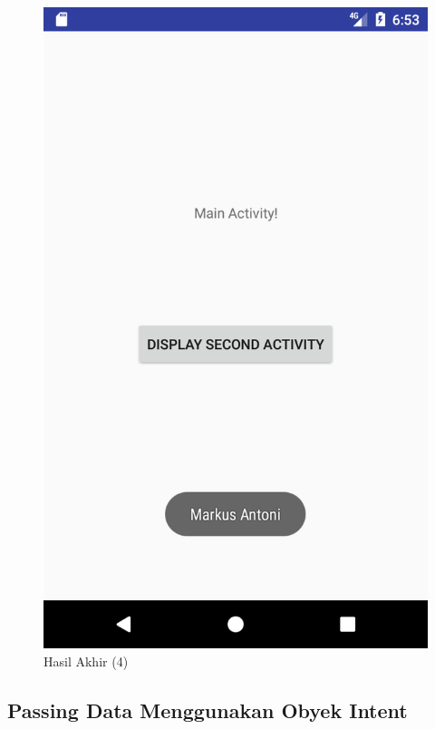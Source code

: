 \documentclass{scrartcl}
\begin{document}
\begin{enumerate}
\begin{figure}[htbp]
\begin{minipage}{.5\textwidth}
		\includegraphics[width=0.7\linewidth]{Screenshot_1496836397}
		\caption{Hasil Akhir (4)}
		\label{fig:screenshot_1496836397}
	\end{minipage}
	\end{figure}

\end{enumerate}

\subsection{Passing Data Menggunakan Obyek Intent}
\end{document}

